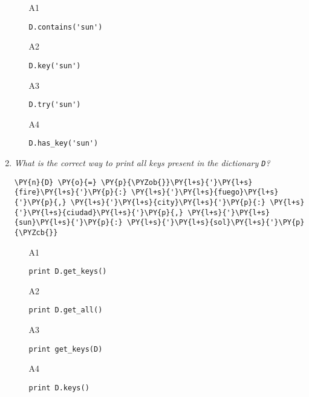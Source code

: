 \begin{enumerate}
\begin{enumerate}
\item[A1] 
\begin{verbatim}
D.contains('sun')
\end{verbatim}
\item[A2] 
\begin{verbatim}
D.key('sun')
\end{verbatim}
\item[A3] 
\begin{verbatim}
D.try('sun')
\end{verbatim}
\item[A4] 
\begin{verbatim}
D.has_key('sun')
\end{verbatim}
\end{enumerate}

\vspace{6mm}

\item {\em What is the correct way to print 
all keys present in the dictionary {\tt D}?}\\

\begin{Verbatim}[commandchars=\\\{\}]
\PY{n}{D} \PY{o}{=} \PY{p}{\PYZob{}}\PY{l+s}{'}\PY{l+s}{fire}\PY{l+s}{'}\PY{p}{:} \PY{l+s}{'}\PY{l+s}{fuego}\PY{l+s}{'}\PY{p}{,} \PY{l+s}{'}\PY{l+s}{city}\PY{l+s}{'}\PY{p}{:} \PY{l+s}{'}\PY{l+s}{ciudad}\PY{l+s}{'}\PY{p}{,} \PY{l+s}{'}\PY{l+s}{sun}\PY{l+s}{'}\PY{p}{:} \PY{l+s}{'}\PY{l+s}{sol}\PY{l+s}{'}\PY{p}{\PYZcb{}}
\end{Verbatim}
\vspace{6mm}

\begin{enumerate}
\item[A1] 
\begin{verbatim}
print D.get_keys()
\end{verbatim}
\item[A2] 
\begin{verbatim}
print D.get_all()
\end{verbatim}
\item[A3] 
\begin{verbatim}
print get_keys(D)
\end{verbatim}
\item[A4] 
\begin{verbatim}
print D.keys()
\end{verbatim}
\end{enumerate}


\end{enumerate}
